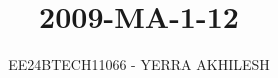 \documentclass[journal]{IEEEtran}
\begin{document}

\vspace{3cm}

\title{2009-MA-1-12}
\author{EE24BTECH11066 - YERRA AKHILESH
}
{\let\newpage\relax\maketitle}

\renewcommand{\thefigure}{\theenumi}
\renewcommand{\thetable}{\theenumi}
\setlength{\intextsep}{10pt} %


\renewcommand{\thetable}{\theenumi}
\end{document}
